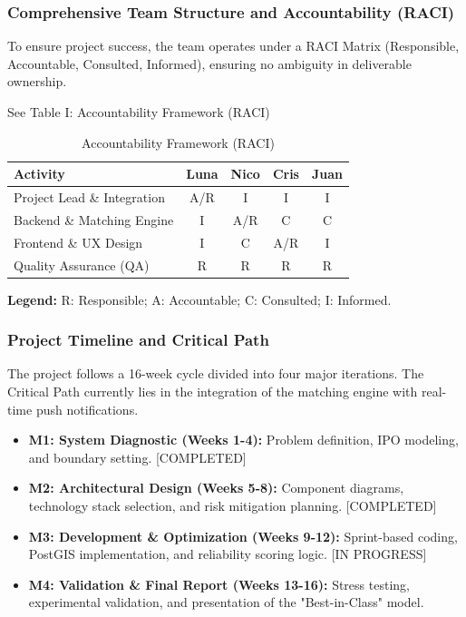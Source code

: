 \documentclass[9pt,conference]{IEEEtran}
\begin{document}
\subsubsection{Comprehensive Team Structure and Accountability (RACI)}


To ensure project success, the team operates under a RACI Matrix (Responsible, Accountable, Consulted, Informed), ensuring no ambiguity in deliverable ownership.

See Table I: Accountability Framework (RACI)

\begin{table}[h]
\centering
\small
\begin{threeparttable}
    \caption{Accountability Framework (RACI)}
    \begin{tabularx}{\columnwidth}{@{} X cccc @{}}
        \toprule
        \textbf{Activity} & \textbf{Luna} & \textbf{Nico} & \textbf{Cris} & \textbf{Juan} \\ \midrule
        Project Lead \& Integration & A/R & I & I & I \\
        Backend \& Matching Engine  & I & A/R & C & C  \\ 
        Frontend \& UX Design       & I & C & A/R & I \\ 
        Quality Assurance (QA)      & R & R  & R  & R   \\
        \bottomrule
    \end{tabularx}
    \begin{tablenotes}
        \small
        \item \textbf{Legend:} R: Responsible; A: Accountable; C: Consulted; I: Informed.
    \end{tablenotes}
\end{threeparttable}
\end{table}

\subsubsection{Project Timeline and Critical Path}

The project follows a 16-week cycle divided into four major iterations. The Critical Path currently lies in the integration of the matching engine with real-time push notifications.
\begin{itemize}
    \item \textbf{M1: System Diagnostic (Weeks 1-4):} Problem definition, IPO modeling, and boundary setting. [COMPLETED]
    \item \textbf{M2: Architectural Design (Weeks 5-8):} Component diagrams, technology stack selection, and risk mitigation planning. [COMPLETED]
    \item \textbf{M3: Development \& Optimization (Weeks 9-12):} Sprint-based coding, PostGIS implementation, and reliability scoring logic. [IN PROGRESS]
    \item \textbf{M4: Validation \& Final Report (Weeks 13-16):} Stress testing, experimental validation, and presentation of the "Best-in-Class" model.
\end{itemize}
\end{document}
